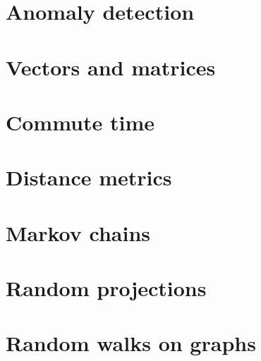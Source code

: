 \section{Anomaly detection}
\label{anomalyDetection}


\section{Vectors and matrices}
\label{vectorsAndMatrices}


\section{Commute time}
\label{commuteTime}


\section{Distance metrics}
\label{distanceMetrics}


\section{Markov chains}
\label{markovChains}


\section{Random projections}
\label{randomProjections}


\section{Random walks on graphs}
\label{randomWalks}


